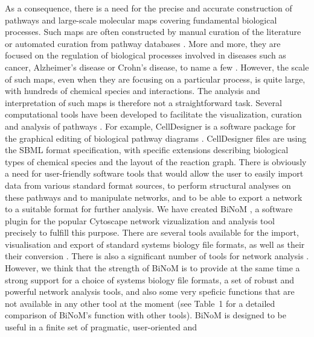 \documentclass[11pt]{bmc_article_s50}
\newenvironment{bmcformat}{\begin{raggedright}\baselineskip20pt\sloppy\setboolean{publ}{false}}{\end{raggedright}\baselineskip20pt\sloppy}
\begin{document}
\begin{bmcformat}
As a consequence, there is a need for the precise and accurate construction of
pathways and large-scale molecular maps covering fundamental biological
processes. Such maps are often constructed by manual curation of the literature or
automated curation from pathway databases \cite{bauer2009pathway}. More and more, they
are focused on the regulation of biological processes involved in diseases such
as cancer, Alzheimer's disease or Crohn's disease, to name a few \cite{oda2005comprehensive, oda2006comprehensive,
calzone2008comprehensive, caron2010comprehensive}. However, the scale of such
maps, even when they are focusing on a particular process, is quite large, with
hundreds of chemical species and interactions. The analysis and interpretation of such
 maps is therefore not a straightforward task. Several computational
tools have been developed to facilitate the visualization, curation and analysis
of pathways \cite{adriaens2008public}. For example, CellDesigner is a software package
for the graphical editing of biological pathway diagrams
\cite{funahashi2003celldesigner}. CellDesigner files are using the SBML format specification, with specific extensions describing
biological types of chemical species and the layout of the reaction graph.  There is obviously
a need for user-friendly software tools that would allow the user to easily
import data from various standard format sources, to perform structural analyses on these pathways
and to manipulate networks, and to be able to export a network to a suitable
format for further analysis. We have created
BiNoM \cite{zinovyev2008binom}, a software plugin for the popular Cytoscape
network vizualization and analysis tool \cite{cline2007integration} precisely to fulfill this purpose.
There are several tools available for the import, visualisation and export of standard systems biology file formats, as well as their their conversion
\cite{funahashi2003celldesigner, mi2011biopax, buchel2012qualitative, ruebenacker2009integrating, konig2012cysbml}. There is also a significant number of tools for network analysis
\cite{su2010glay, bader2003automated, szalay2012moduland,
morris2011clustermaker, rivera2010nemo}. However, we think that the strength of
BiNoM is to provide at the same time a strong support for a choice of systems
biology file formats, a set of robust and powerful network analysis tools, and
also some very speficic functions that are not available in any other tool at
the moment (see Table~1 for a detailed comparison of BiNoM's function with other
tools).
BiNoM is designed to be useful in a finite set of pragmatic, user-oriented and

\end{bmcformat}
\end{document}
